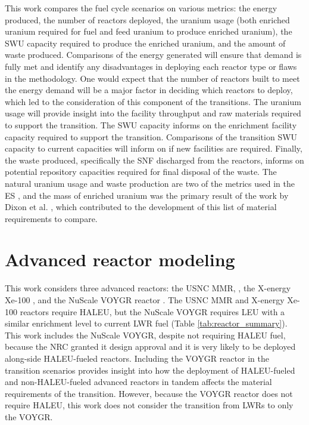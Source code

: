 This work compares the fuel cycle scenarios on various metrics: 
the energy produced, the number of reactors deployed, the 
uranium usage (both enriched uranium required for fuel and feed uranium 
to produce enriched uranium), 
the \gls{SWU} capacity required to produce the enriched uranium, and the 
amount of waste produced. Comparisons of the energy generated will ensure 
that demand is fully met and identify any disadvantages in deploying each 
reactor type or flaws in the methodology. One would expect that the
number of reactors built to meet the energy demand will be a major 
factor in deciding which reactors to deploy, which led to the 
consideration of this component of the transitions. The uranium usage 
will provide insight into the facility throughput and raw materials 
required to support the 
transition. The \gls{SWU} capacity informs on the enrichment facility 
capacity required to support the transition. Comparisons of the transition 
\gls{SWU} capacity to current capacities will inform on if new facilities 
are required. Finally, the waste produced, specifically the \gls{SNF} 
discharged from the reactors, informs on potential repository capacities 
required for final disposal of the waste. The natural 
uranium usage and waste production are two of the metrics used in the 
\acrfull{ES} 
\cite{wigeland_nuclear_2014}, and the mass of enriched uranium was the 
primary result of the work by Dixon et al. \cite{dixon_estimated_2022}, 
which contributed to the development of this list of material 
requirements to compare.

\section{Advanced reactor modeling} \label{sec:reactor_methods}
This work considers three advanced reactors: the \gls{USNC} \gls{MMR}, 
\cite{noauthor_usnc_2021,mitchell_usnc_2020}, the X-energy Xe-100 
\cite{mulder_overview_2021}, and 
the NuScale VOYGR reactor
\cite{nuscale_chapter_2020-1,reyes_nuscale_2021,reyes_correction_2022}. The 
\gls{USNC} \gls{MMR}
and X-energy Xe-100 reactors require \gls{HALEU}, but the NuScale VOYGR 
requires \gls{LEU} with a similar enrichment level to current \gls{LWR} fuel 
(Table \ref{tab:reactor_summary}). This work includes the NuScale VOYGR, 
despite not requiring \gls{HALEU} fuel, 
because the \gls{NRC} granted it design approval \cite{world_nuclear_news_nuscale_2021} 
and it is very likely to be 
deployed along-side \gls{HALEU}-fueled reactors. Including the  
VOYGR reactor in the transition scenarios provides insight into how the 
deployment of \gls{HALEU}-fueled and non-\gls{HALEU}-fueled advanced 
reactors in tandem 
affects the material requirements of the transition. However, because the 
VOYGR reactor does not require 
\gls{HALEU}, this work does not consider the transition from \glspl{LWR} 
to only the VOYGR.

